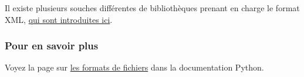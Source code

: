 Il existe plusieurs souches différentes de bibliothèques prenant en
charge le format XML,
\href{https://docs.python.org/3/library/xml.html}{qui sont introduites
ici}.

    \hypertarget{pour-en-savoir-plus}{%
\subsubsection{Pour en savoir plus}\label{pour-en-savoir-plus}}

    Voyez la page sur
\href{https://docs.python.org/3/library/fileformats.html}{les formats de
fichiers} dans la documentation Python.


    
    
    
